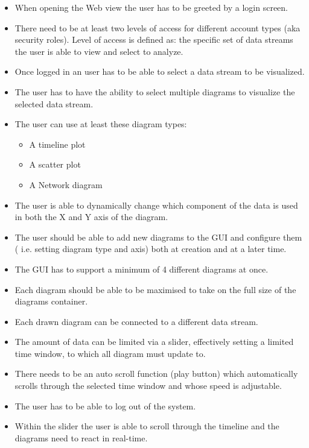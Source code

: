 \documentclass[twoside, english, draft]{Pflichtenheft}
\begin{document}
\begin{itemize}
\item{When opening the Web view the user has to be greeted by a login screen.}

\item{There need to be at least two levels of access for different account types (aka security \glspl{role}).
Level of access is defined as: the specific set of \glspl{data stream} the user is able to view and select to analyze.}
\item{Once logged in an user has to be able to select a data stream to be visualized.}
\item{The user has to have the ability to select multiple \glspl{diagram} to visualize the selected data stream.}
\item{The user can use at least these \glspl{diagram type}:}
\begin{itemize}
\item{A timeline plot}
\item{A scatter plot}
\item{A Network diagram}
\end{itemize}
\item{The user is able to dynamically change which component of the data is used in both the X and Y axis of the diagram.}
\item{The user should be able to add new diagrams to the GUI and configure them ( i.e. setting diagram type and axis) both at creation and at a later time.
}
\item{The GUI has to support a minimum of 4 different diagrams at once.}
\item{Each diagram should be able to be maximised to take on the full size of the diagrams container.}
\item{Each drawn diagram can be connected to a different data stream.}
\item{The amount of data can be limited via a slider, effectively setting a limited time window, to which all diagram must update to.}
\item{There needs to be an auto scroll function (play button) which automatically scrolls through the selected time window and whose speed is adjustable.}
\item{The user has to be able to log out of the system.}
\item{Within the slider the user is able to scroll through the timeline and the diagrams need to react in real-time.}

\end{itemize}
\end{document}
